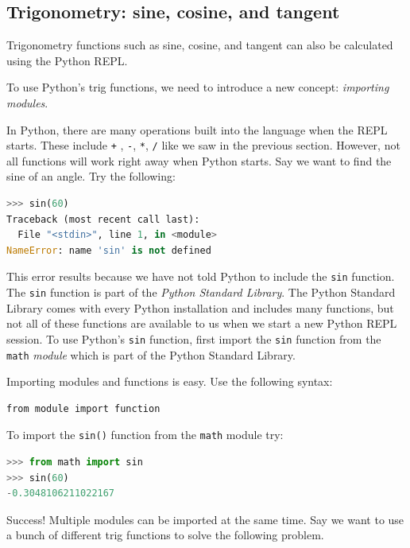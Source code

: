 \documentclass{book}
\begin{document}
    
        \subsection{Trigonometry: sine, cosine, and
tangent}\label{trigonometry-sine-cosine-and-tangent}
    




    
        Trigonometry functions such as sine, cosine, and tangent can also be
calculated using the Python REPL.

To use Python's trig functions, we need to introduce a new concept:
\emph{importing modules}.

In Python, there are many operations built into the language when the
REPL starts. These include \lstinline!+! , \lstinline!-!, \lstinline!*!,
\lstinline!/! like we saw in the previous section. However, not all
functions will work right away when Python starts. Say we want to find
the sine of an angle. Try the following:

\begin{lstlisting}[language=Python]
>>> sin(60)
Traceback (most recent call last):
  File "<stdin>", line 1, in <module>
NameError: name 'sin' is not defined
\end{lstlisting}

This error results because we have not told Python to include the
\lstinline!sin! function. The \lstinline!sin! function is part of the
\emph{Python Standard Library}. The Python Standard Library comes with
every Python installation and includes many functions, but not all of
these functions are available to us when we start a new Python REPL
session. To use Python's \lstinline!sin! function, first import the
\lstinline!sin! function from the \lstinline!math! \emph{module} which
is part of the Python Standard Library.

Importing modules and functions is easy. Use the following syntax:

\begin{lstlisting}
from module import function
\end{lstlisting}

To import the \lstinline!sin()! function from the \lstinline!math!
module try:

\begin{lstlisting}[language=Python]
>>> from math import sin
>>> sin(60)
-0.3048106211022167
\end{lstlisting}

Success! Multiple modules can be imported at the same time. Say we want
to use a bunch of different trig functions to solve the following
problem.
\end{document}
